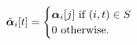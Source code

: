\begin{equation}
\tilde{\boldsymbol\alpha}_i[t] = \begin{cases}
\boldsymbol\alpha_i[j] \mbox{ if } (i,t)\in S\\
0 \mbox{ otherwise.}
\end{cases}
\end{equation}
%
%
%
%
%
%
%
%
